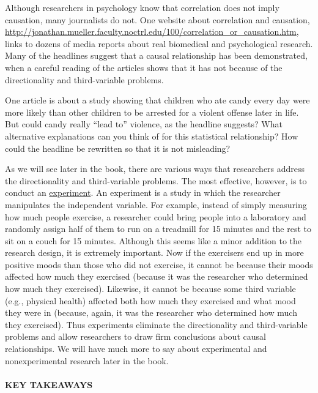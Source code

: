 \documentclass[
]{krantz}
\begin{document}
Although researchers in psychology know that correlation does not imply causation, many journalists do not. One website about correlation and causation, \url{http://jonathan.mueller.faculty.noctrl.edu/100/correlation_or_causation.htm}, links to dozens of media reports about real biomedical and psychological research. Many of the headlines suggest that a causal relationship has been demonstrated, when a careful reading of the articles shows that it has not because of the directionality and third-variable problems.

One article is about a study showing that children who ate candy every day were more likely than other children to be arrested for a violent offense later in life. But could candy really ``lead to'' violence, as the headline suggests? What alternative explanations can you think of for this statistical relationship? How could the headline be rewritten so that it is not misleading?

As we will see later in the book, there are various ways that researchers address the directionality and third-variable problems. The most effective, however, is to conduct an \hyperref[experiment]{experiment}. An experiment is a study in which the researcher manipulates the independent variable. For example, instead of simply measuring how much people exercise, a researcher could bring people into a laboratory and randomly assign half of them to run on a treadmill for 15 minutes and the rest to sit on a couch for 15 minutes. Although this seems like a minor addition to the research design, it is extremely important. Now if the exercisers end up in more positive moods than those who did not exercise, it cannot be because their moods affected how much they exercised (because it was the researcher who determined how much they exercised). Likewise, it cannot be because some third variable (e.g., physical health) affected both how much they exercised and what mood they were in (because, again, it was the researcher who determined how much they exercised). Thus experiments eliminate the directionality and third-variable problems and allow researchers to draw firm conclusions about causal relationships. We will have much more to say about experimental and nonexperimental research later in the book.

\paragraph*{KEY TAKEAWAYS}\label{key-takeaways-4}
\end{document}
